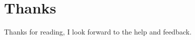 \section*{Thanks}
Thanks for reading, I look forward to the help and feedback.


	
		

\clearpage

\theendnotes
